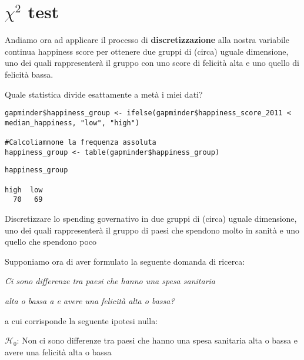 \section{$\chi^2$ test}

Andiamo ora ad applicare il processo di \textbf{discretizzazione} alla nostra variabile continua happiness score per ottenere due gruppi di (circa) uguale dimensione, uno dei quali rappresenter\`a il gruppo con uno score di felicit\`a alta e uno quello di felicit\`a bassa. 

\noindent Quale statistica divide esattamente a met\`a i miei dati?

\begin{lstlisting}[style=Rstylescript]
gapminder$happiness_group <- ifelse(gapminder$happiness_score_2011 < median_happiness, "low", "high")

#Calcoliamnone la frequenza assoluta
happiness_group <- table(gapminder$happiness_group)
\end{lstlisting}


\begin{lstlisting}[style=Rstyle]
happiness_group

high  low 
  70   69
\end{lstlisting}

\vspace{0.5cm} 

\begin{exercise}\label{ex5.5}

\noindent Discretizzare lo spending governativo in due gruppi di (circa) uguale dimensione, uno dei quali rappresenter\`a il gruppo di paesi che spendono molto in sanit\`a e uno quello che spendono poco 

\end{exercise}

\noindent Supponiamo ora di aver formulato la seguente domanda di ricerca: 

\vspace{0.2cm}

\centerline{\emph{Ci sono differenze tra paesi che hanno una spesa sanitaria}}
\centerline{\emph{alta o bassa a e avere una felicit\`a alta o bassa?}}

\vspace{0.2cm}

\noindent a cui corrisponde la seguente ipotesi nulla:

\vspace{0.2cm}

\noindent $\mathcal{H}_0$: Non ci sono differenze tra paesi che hanno una spesa sanitaria alta o bassa e avere una felicit\`a alta o bassa

